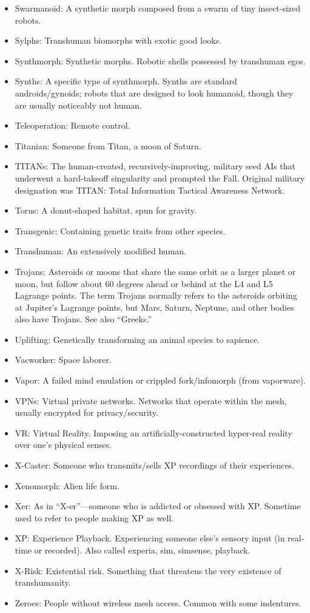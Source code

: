 \begin{itemize}
\item Swarmanoid: A synthetic morph composed from a swarm of tiny
  insect-sized robots.
\item Sylphs: Transhuman biomorphs with exotic good looks.
\item Synthmorph: Synthetic morphs. Robotic shells possessed by
  transhuman egos.
\item Synths: A specific type of synthmorph. Synths are standard
  androids/gynoids; robots that are designed to look humanoid, though
  they are usually noticeably not human.
\item Teleoperation: Remote control.
\item Titanian: Someone from Titan, a moon of Saturn.
\item TITANs: The human-created, recursively-improving, military seed
  AIs that underwent a hard-takeoff singularity and prompted the
  Fall. Original military designation was TITAN: Total Information
  Tactical Awareness Network.
\item Torus: A donut-shaped habitat, spun for gravity.
\item Transgenic: Containing genetic traits from other species.
\item Transhuman: An extensively modified human.
\item Trojans: Asteroids or moons that share the same orbit as a
  larger planet or moon, but follow about 60 degrees ahead or behind
  at the L4 and L5 Lagrange points. The term Trojans normally refers
  to the asteroids orbiting at Jupiter's Lagrange points, but Mars,
  Saturn, Neptune, and other bodies also have Trojans. See also
  ``Greeks.''
\item Uplifting: Genetically transforming an animal species to
  sapience.
\item Vacworker: Space laborer.
\item Vapor: A failed mind emulation or crippled fork/infomorph (from
  vaporware).
\item VPNs: Virtual private networks. Networks that operate within the
  mesh, usually encrypted for privacy/security.
\item VR: Virtual Reality. Imposing an artificially-constructed
  hyper-real reality over one's physical senses.
\item X-Caster: Someone who transmits/sells XP recordings of their
  experiences.
\item Xenomorph: Alien life form.
\item Xer: As in ``X-er''—someone who is addicted or obsessed with
  XP. Sometime used to refer to people making XP as well.
\item XP: Experience Playback. Experiencing someone else's sensory
  input (in real-time or recorded). Also called experia, sim,
  simsense, playback.
\item X-Risk: Existential risk. Something that threatens the very
  existence of transhumanity.
\item Zeroes: People without wireless mesh access. Common with some
  indentures.
\end{itemize}

